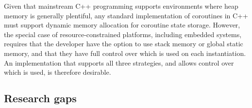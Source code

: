 Given that mainstream C++ programming supports environments where heap memory is generally plentiful, any standard implementation of coroutines in C++ must support dynamic memory allocation for coroutine state storage. However, the special case of resource-constrained platforms, including embedded systems, requires that the developer have the option to use stack memory or global static memory, and that they have full control over which is used on each instantiation. An implementation that supports all three strategies, and allows control over which is used, is therefore desirable.%

\subsection{Research gaps}

\newenvironment{vheader}
{ \begin{sideways}\centering\begin{tabular}{c} }
{ \end{tabular}\end{sideways} }


